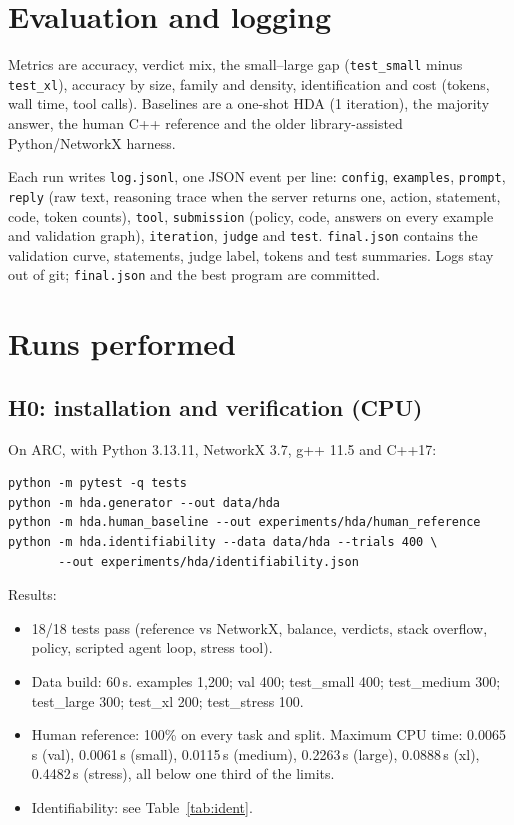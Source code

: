 \documentclass[11pt]{article}
\begin{document}
\section{Evaluation and logging}

Metrics are accuracy, verdict mix, the small--large gap
(\texttt{test\_small} minus \texttt{test\_xl}), accuracy by size, family and
density, identification and cost (tokens, wall time, tool calls). Baselines are
a one-shot HDA (1 iteration), the majority answer, the human C++ reference and
the older library-assisted Python/NetworkX harness.

Each run writes \texttt{log.jsonl}, one JSON event per line:
\texttt{config}, \texttt{examples}, \texttt{prompt}, \texttt{reply} (raw text,
reasoning trace when the server returns one, action, statement, code, token
counts), \texttt{tool}, \texttt{submission} (policy, code, answers on every
example and validation graph), \texttt{iteration}, \texttt{judge} and
\texttt{test}. \texttt{final.json} contains the validation curve, statements,
judge label, tokens and test summaries. Logs stay out of git; \texttt{final.json}
and the best program are committed.

\section{Runs performed}

\subsection{H0: installation and verification (CPU)}

On ARC, with Python 3.13.11, NetworkX 3.7, g++ 11.5 and C++17:

\begin{verbatim}
python -m pytest -q tests
python -m hda.generator --out data/hda
python -m hda.human_baseline --out experiments/hda/human_reference
python -m hda.identifiability --data data/hda --trials 400 \
       --out experiments/hda/identifiability.json
\end{verbatim}

Results:

\begin{itemize}[leftmargin=1.4em]
\item 18/18 tests pass (reference vs NetworkX, balance, verdicts, stack
overflow, policy, scripted agent loop, stress tool).
\item Data build: 60\,s. examples 1{,}200; val 400; test\_small 400;
test\_medium 300; test\_large 300; test\_xl 200; test\_stress 100.
\item Human reference: 100\% on every task and split. Maximum CPU time:
0.0065\,s (val), 0.0061\,s (small), 0.0115\,s (medium), 0.2263\,s (large),
0.0888\,s (xl), 0.4482\,s (stress), all below one third of the limits.
\item Identifiability: see Table~\ref{tab:ident}.
\end{itemize}
\end{document}
